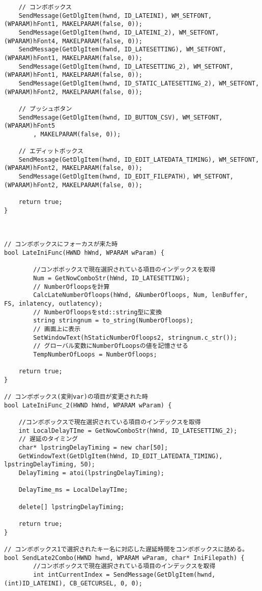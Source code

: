 \begin{verbatim}
	// コンボボックス
	SendMessage(GetDlgItem(hwnd, ID_LATEINI), WM_SETFONT, (WPARAM)hFont1, MAKELPARAM(false, 0));
	SendMessage(GetDlgItem(hwnd, ID_LATEINI_2), WM_SETFONT, (WPARAM)hFont4, MAKELPARAM(false, 0));
	SendMessage(GetDlgItem(hwnd, ID_LATESETTING), WM_SETFONT, (WPARAM)hFont1, MAKELPARAM(false, 0));
	SendMessage(GetDlgItem(hwnd, ID_LATESETTING_2), WM_SETFONT, (WPARAM)hFont1, MAKELPARAM(false, 0));
	SendMessage(GetDlgItem(hwnd, ID_STATIC_LATESETTING_2), WM_SETFONT, (WPARAM)hFont2, MAKELPARAM(false, 0));

	// プッシュボタン
	SendMessage(GetDlgItem(hwnd, ID_BUTTON_CSV), WM_SETFONT, (WPARAM)hFont5
		, MAKELPARAM(false, 0));
	
	// エディットボックス
	SendMessage(GetDlgItem(hwnd, ID_EDIT_LATEDATA_TIMING), WM_SETFONT, (WPARAM)hFont2, MAKELPARAM(false, 0));
	SendMessage(GetDlgItem(hwnd, ID_EDIT_FILEPATH), WM_SETFONT, (WPARAM)hFont2, MAKELPARAM(false, 0));

	return true;
}



// コンボボックスにフォーカスが来た時
bool LateIniFunc(HWND hWnd, WPARAM wParam) {

		//コンボボックスで現在選択されている項目のインデックスを取得
		Num = GetNowComboStr(hWnd, ID_LATESETTING);
		// NumberOfloopsを計算
		CalcLateNumberOfloops(hWnd, &NumberOfloops, Num, lenBuffer, FS, inlatency, outlatency);
		// NumberOfloopsをstd::string型に変換
		string stringnum = to_string(NumberOfloops);
		// 画面上に表示
		SetWindowText(hStaticNumberOfloops2, stringnum.c_str());
		// グローバル変数にNumberOfLoopsの値を記憶させる
		TempNumberOfLoops = NumberOfloops;

	return true;
}

// コンボボックス(変則var)の項目が変更された時
bool LateIniFunc_2(HWND hWnd, WPARAM wParam) {

	//コンボボックスで現在選択されている項目のインデックスを取得
	int LocalDelayTIme = GetNowComboStr(hWnd, ID_LATESETTING_2);
	// 遅延のタイミング
	char* lpstringDelayTiming = new char[50];
	GetWindowText(GetDlgItem(hWnd, ID_EDIT_LATEDATA_TIMING), lpstringDelayTiming, 50);
	DelayTiming = atoi(lpstringDelayTiming);

	DelayTime_ms = LocalDelayTIme;

	delete[] lpstringDelayTiming;

	return true;
}

// コンボボックス1で選択されたキー名に対応した遅延時間をコンボボックスに詰める。
bool SendLate2Combo(HWND hwnd, WPARAM wParam, char* IniFilepath) {
		//コンボボックスで現在選択されている項目のインデックスを取得
		int intCurrentIndex = SendMessage(GetDlgItem(hwnd, (int)ID_LATEINI), CB_GETCURSEL, 0, 0);


\end{verbatim}
